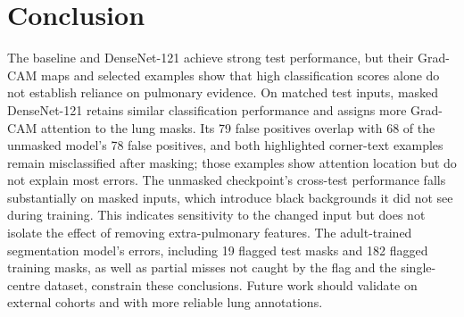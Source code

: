 \documentclass[twoside,a4paper,11pt]{article}
\begin{document}
\section{Conclusion}
The baseline and DenseNet-121 achieve strong test performance, but their Grad-CAM maps and selected examples show that high classification scores alone do not establish reliance on pulmonary evidence. On matched test inputs, masked DenseNet-121 retains similar classification performance and assigns more Grad-CAM attention to the lung masks. Its 79 false positives overlap with 68 of the unmasked model's 78 false positives, and both highlighted corner-text examples remain misclassified after masking; those examples show attention location but do not explain most errors. The unmasked checkpoint's cross-test performance falls substantially on masked inputs, which introduce black backgrounds it did not see during training. This indicates sensitivity to the changed input but does not isolate the effect of removing extra-pulmonary features. The adult-trained segmentation model's errors, including 19 flagged test masks and 182 flagged training masks, as well as partial misses not caught by the flag and the single-centre dataset, constrain these conclusions. Future work should validate on external cohorts and with more reliable lung annotations.



\end{document}
